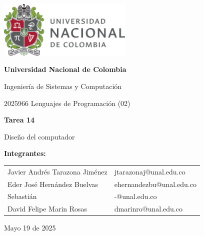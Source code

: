 \documentclass{article}
\begin{document}
\begin{titlepage}
  \centering
  \includegraphics[width=0.48\textwidth]{logo_universidad.png}
  \par\vspace{2cm}

  {\Large \textbf{Universidad Nacional de Colombia} \par}
  \vspace{0.5cm}
  {\large Ingeniería de Sistemas y Computación \par}
  {\large 2025966 Lenguajes de Programación (02)\par}
  \vspace{3cm}

  {\large \textbf{Tarea 14} \par}
  {\large Diseño del computador\par}
  \vspace{3cm}

  {\large \textbf{Integrantes:} \par}
  \vspace{0.5cm}
  \begin{tabular}{ll}
    Javier Andrés Tarazona Jiménez & jtarazonaj@unal.edu.co   \\
    Eder  José Hernández Buelvas   & ehernandezbu@unal.edu.co \\
    Sebastián                      & -@unal.edu.co            \\
    David Felipe Marin Rosas       & dmarinro@unal.edu.co     \\
  \end{tabular}
  \par\vspace{3cm}

  {\large Mayo 19 de 2025 \par}
\end{titlepage}

\tableofcontents %

\newpage %
\end{document}
